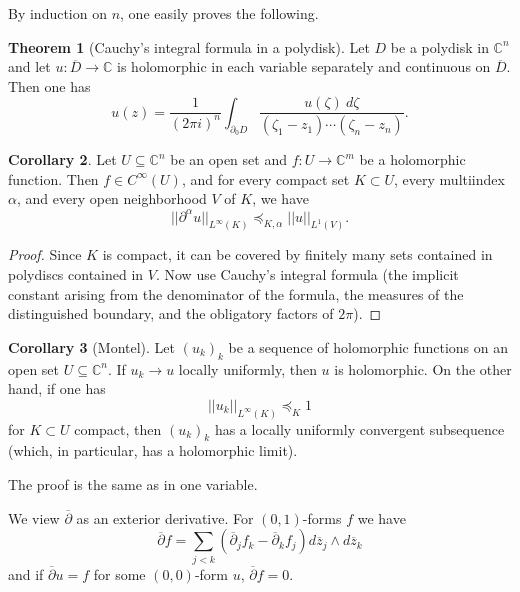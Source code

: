 \documentclass[12pt]{report}
\newcommand{\CC}{\mathbb{C}}
\newcommand{\dbar}{\overline\partial}
\theoremstyle{definition}
\newtheorem{theorem}{Theorem}[chapter]
\newtheorem{corollary}[theorem]{Corollary}
\begin{document}
By induction on $n$, one easily proves the following.
\begin{theorem}[Cauchy's integral formula in a polydisk]
    Let $D$ be a polydisk in $\CC^n$ and let $u: \overline D \to \CC$ is holomorphic in each variable separately and continuous on $\overline D$. Then one has
    $$u(z) = \frac{1}{(2\pi i)^n} \int_{\partial_0 D} \frac{u(\zeta) ~d\zeta}{(\zeta_1 - z_1)\cdots(\zeta_n - z_n)}.$$
\end{theorem}
\begin{corollary}
    Let $U \subseteq \CC^n$ be an open set and $f: U \to \CC^m$ be a holomorphic function. Then $f \in C^\infty(U)$, and for every compact set $K \subset U$, every multiindex $\alpha$, and every open neighborhood $V$ of $K$, we have
    $$||\partial^\alpha u||_{L^\infty(K)} \preceq_{K,\alpha} ||u||_{L^1(V)}.$$
\end{corollary}
\begin{proof}
    Since $K$ is compact, it can be covered by finitely many sets contained in polydiscs contained in $V$. Now use Cauchy's integral formula (the implicit constant arising from the denominator of the formula, the measures of the distinguished boundary, and the obligatory factors of $2\pi$).
\end{proof}
\begin{corollary}[Montel]
    Let $(u_k)_k$ be a sequence of holomorphic functions on an open set $U \subseteq \CC^n$. If $u_k \to u$ locally uniformly, then $u$ is holomorphic. On the other hand, if one has
    $$||u_k||_{L^\infty(K)} \preceq_K 1$$
    for $K \subset U$ compact, then $(u_k)_k$ has a locally uniformly convergent subsequence (which, in particular, has a holomorphic limit).
\end{corollary}
The proof is the same as in one variable.

We view $\dbar$ as an exterior derivative. For $(0, 1)$-forms $f$ we have
$$\dbar f = \sum_{j<k} (\dbar_j f_k - \dbar_k f_j) d\overline z_j \wedge d\overline z_k$$
and if $\dbar u = f$ for some $(0, 0)$-form $u$, $\dbar f = 0$.
\end{document}
